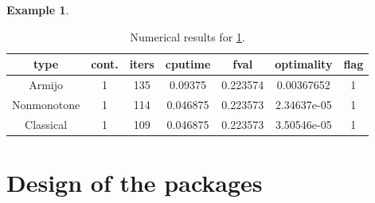 \documentclass[a4paper]{article}
\newtheorem{example}{Example}
\begin{document}
  \begin{example}\label{exp1}
    
  \end{example}
  
  \begin{table}
    \centering
    \begin{tabular}{cc|ccccc}
      \hline
      type & cont. & iters & cputime & 
      fval & optimality & flag \\ \hline
      Armijo & 1 & 135 & 0.09375 & 0.223574 & 0.00367652 & 1 \\
      Nonmonotone & 1 & 114 & 0.046875 & 0.223573 & 2.34637e-05 & 1 \\
      Classical & 1 & 109 & 0.046875 & 0.223573 & 3.50546e-05 & 1 \\
      \hline
    \end{tabular}
    \caption{Numerical results for \cref{exp1}.}
  \end{table}
  
  
  
  
  
  \appendix
  \renewcommand{\appendixname}{Appendix~\Alph{section}}
  
  
  \section{Design of the packages}
  \label{app:design}
  
\end{document}

